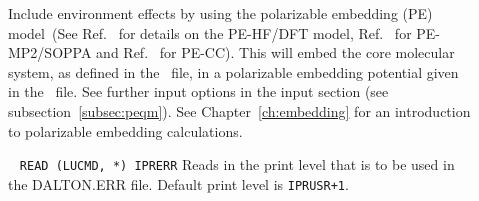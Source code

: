 \begin{description}
%



\item[] Include environment effects by using the polarizable embedding (PE)
model~(See Ref.~\cite{pescf} for details on the PE-HF/DFT model, Ref.~\cite{pesoppa}
for PE-MP2/SOPPA and Ref.~\cite{pecc} for PE-CC).
This will embed the core molecular system, as defined in the \molinp\ file, in a
polarizable embedding potential given in the \potinp\ file. See further input options
in the  input section (see subsection~\ref{subsec:peqm}). See
Chapter~\ref{ch:embedding} for an introduction to polarizable embedding calculations.

\item[]\verb| |\newline
\verb|READ (LUCMD, *) IPRERR|
 
Reads in the print level that is to be used in the DALTON.ERR
file. Default print level is \verb|IPRUSR+1|.


\end{description}
